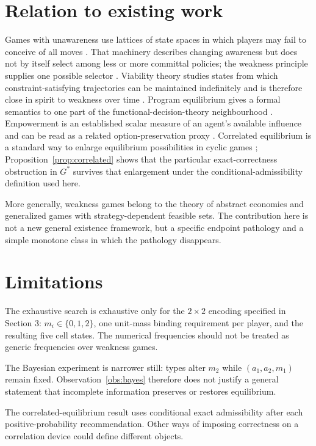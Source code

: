 \documentclass[11pt]{article}
\theoremstyle{definition}
\begin{document}
\section{Relation to existing work}
Games with unawareness use lattices of state spaces in which players may fail to conceive of all moves \cite{heifetz,halpernrego}. That machinery describes changing awareness but does not by itself select among less or more committal policies; the weakness principle supplies one possible selector \cite{bennett2025,ord}. Viability theory studies states from which constraint-satisfying trajectories can be maintained indefinitely and is therefore close in spirit to weakness over time \cite{aubin}. Program equilibrium gives a formal semantics to one part of the functional-decision-theory neighbourhood \cite{tennenholtz}. Empowerment is an established scalar measure of an agent's available influence and can be read as a related option-preservation proxy \cite{klyubin}. Correlated equilibrium is a standard way to enlarge equilibrium possibilities in cyclic games \cite{aumann}; Proposition~\ref{prop:correlated} shows that the particular exact-correctness obstruction in $G^*$ survives that enlargement under the conditional-admissibility definition used here.

More generally, weakness games belong to the theory of abstract economies and generalized games with strategy-dependent feasible sets. The contribution here is not a new general existence framework, but a specific endpoint pathology and a simple monotone class in which the pathology disappears.

\section{Limitations}
The exhaustive search is exhaustive only for the $2\times2$ encoding specified in Section 3: $m_i\in\{0,1,2\}$, one unit-mass binding requirement per player, and the resulting five cell states. The numerical frequencies should not be treated as generic frequencies over weakness games.

The Bayesian experiment is narrower still: types alter $m_2$ while $(a_1,a_2,m_1)$ remain fixed. Observation~\ref{obs:bayes} therefore does not justify a general statement that incomplete information preserves or restores equilibrium.

The correlated-equilibrium result uses conditional exact admissibility after each positive-probability recommendation. Other ways of imposing correctness on a correlation device could define different objects.
\end{document}
